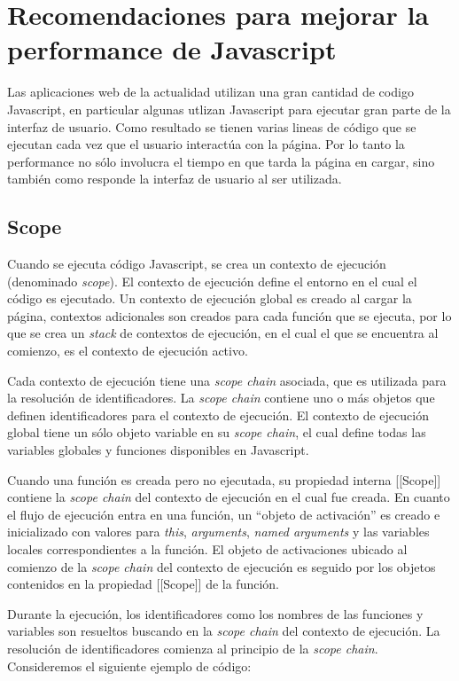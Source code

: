 
\chapter{Recomendaciones para mejorar la performance de Javascript}
Las aplicaciones web de la actualidad utilizan una gran cantidad de codigo Javascript, en particular algunas utlizan Javascript para ejecutar gran parte de la
interfaz de usuario. Como resultado se tienen varias lineas de código que se ejecutan cada vez que el usuario interactúa con la página. Por lo tanto la performance
no sólo involucra el tiempo en que tarda la página en cargar, sino también como responde la interfaz de usuario al ser utilizada.

\section{Scope}
Cuando se ejecuta código Javascript, se crea un contexto de ejecución (denominado \emph{scope}). El contexto de ejecución define el entorno en el cual el código es
ejecutado. Un contexto de ejecución global es creado al cargar la página, contextos adicionales son creados para cada función que se ejecuta, por lo que se crea
un \emph{stack} de contextos de ejecución, en el cual el que se encuentra al comienzo, es el contexto de ejecución activo.

Cada contexto de ejecución tiene una \emph{scope chain} asociada, que es utilizada para la resolución de identificadores. La \emph{scope chain} contiene uno o más
objetos que definen identificadores para el contexto de ejecución. El contexto de ejecución global tiene un sólo objeto variable en su \emph{scope chain}, el cual define
todas las variables globales y funciones disponibles en Javascript.

Cuando una función es creada pero no ejecutada, su propiedad interna [[Scope]] contiene la \emph{scope chain} del contexto de ejecución en el cual fue creada. En
cuanto el flujo de ejecución entra en una función, un ``objeto de activación'' es creado e inicializado con valores para \emph{this}, \emph{arguments}, \emph{named arguments}
y las variables locales correspondientes a la función. El objeto de activaciones ubicado al comienzo de la \emph{scope chain} del contexto de ejecución es seguido por
los objetos contenidos en la propiedad [[Scope]] de la función.

Durante la ejecución, los identificadores como los nombres de las funciones y variables son resueltos buscando en la \emph{scope chain} del contexto de ejecución. La resolución
de identificadores comienza al principio de la \emph{scope chain}. Consideremos el siguiente ejemplo de código:

